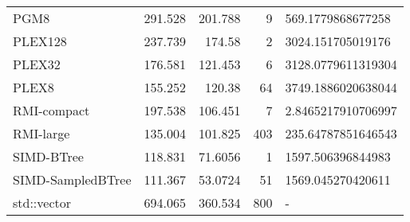 \begin{tabular}{lrrrl}
 PGM8              &                291.528 &              201.788  &            9 & 569.1779868677258  \\
 PLEX128           &                237.739 &              174.58   &            2 & 3024.151705019176  \\
 PLEX32            &                176.581 &              121.453  &            6 & 3128.0779611319304 \\
 PLEX8             &                155.252 &              120.38   &           64 & 3749.1886020638044 \\
 RMI-compact       &                197.538 &              106.451  &            7 & 2.8465217910706997 \\
 RMI-large         &                135.004 &              101.825  &          403 & 235.64787851646543 \\
 SIMD-BTree        &                118.831 &               71.6056 &            1 & 1597.506396844983  \\
 SIMD-SampledBTree &                111.367 &               53.0724 &           51 & 1569.045270420611  \\
 std::vector       &                694.065 &              360.534  &          800 & -                  \\
\hline
\end{tabular}